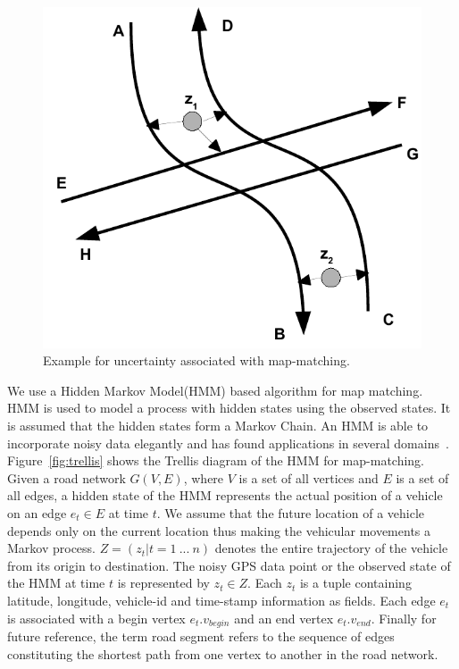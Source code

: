\documentclass{wscpaperproc}
\theoremstyle{wsc}
\begin{document}
\begin{figure}[h]
 \centering
 \includegraphics[scale=0.7]{hmm1.pdf}
 \caption{Example for uncertainty associated with map-matching.}
 \label{fig:example}
\end{figure}

We use a Hidden Markov Model(HMM) based algorithm for map matching. HMM is used to model a  process with hidden states using the  observed states. It is assumed that the hidden states form a Markov Chain. An HMM is able to incorporate noisy data elegantly and has found applications in several domains~\cite{rabiner1989tutorial}. Figure~\ref{fig:trellis} shows the Trellis diagram of the HMM for map-matching. Given a road network $G(V,E)$, where $V$ is a set of all vertices and $E$ is a set of all edges, a hidden state of the HMM represents the actual position of a vehicle on an edge $e_{t} \in E$ at time $t$. We assume that the future location of a vehicle depends only on the current location thus making the vehicular movements a Markov process. $Z=(z_{t}|t=1~...~n)$ denotes the entire trajectory of the vehicle from its origin to destination.  The noisy GPS data point or the observed state of the HMM at time $t$ is represented by $z_{t} \in Z$. Each $z_{t}$ is a tuple containing latitude, longitude, vehicle-id and time-stamp information as fields. Each edge $e_{t}$ is associated with a begin vertex $e_{t}.v_{begin}$ and an end vertex $e_{t}.v_{end}$. Finally for future reference, the term road segment refers to the sequence of edges constituting the shortest path from one vertex to another in the road network.
\end{document}
